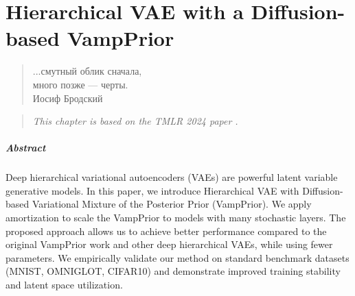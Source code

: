





\chapter{Hierarchical VAE with a Diffusion-based VampPrior}\label{chap:dvp}
\begin{quote}
\normalsize\itshape
\begin{flushright}
\foreignlanguage{russian}{...смутный облик сначала,}\\
\foreignlanguage{russian}{много позже — черты.}  \\
\foreignlanguage{russian}{Иосиф Бродский} \\ \vskip 20pt
\end{flushright}
\end{quote}


\begin{verse}
\textit{
\hfill This chapter is based on the TMLR 2024 paper \citep{kuzina2024hierarchical}.
} 
\end{verse}

\paragraph{Abstract}
Deep hierarchical variational autoencoders (VAEs) are powerful latent variable generative models. 
In this paper, we introduce Hierarchical VAE with Diffusion-based Variational Mixture of the Posterior Prior (VampPrior).
We apply amortization to scale the VampPrior to models with many stochastic layers. 
The proposed approach allows us to  achieve better performance compared to the original VampPrior work and other deep hierarchical VAEs, while using fewer parameters.
We empirically validate our method on standard benchmark datasets (MNIST, OMNIGLOT, CIFAR10) and demonstrate improved training stability and latent space utilization.
\newpage

